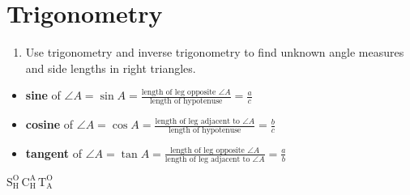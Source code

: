 \documentclass{article}
\begin{document}
\section*{Trigonometry}

\begin{tcolorbox}[colframe=orange!70!white, coltitle=black, title=\textbf{Today I Can}]
\begin{enumerate}
    \item Use trigonometry and inverse trigonometry to find unknown angle measures and side lengths in right triangles.
\end{enumerate}
\end{tcolorbox}
\bigskip 

\begin{minipage}{0.3\textwidth}
\end{minipage}
\begin{minipage}{0.6\textwidth}
\begin{itemize} \setlength{\itemsep}{15pt}
    \item \textbf{sine} of $\angle A = \sin A = \frac{\text{length of leg opposite }\angle A}{\text{length of hypotenuse}} = \frac{a}{c}$
    
    \item \textbf{cosine} of $\angle A = \cos A = \frac{\text{length of leg adjacent to }\angle A}{\text{length of hypotenuse}} = \frac{b}{c}$

    \item \textbf{tangent} of $\angle A = \tan A = \frac{\text{length of leg opposite }\angle A}{\text{length of leg adjacent to }\angle A} = \frac{a}{b}$
\end{itemize}
\end{minipage}
\smallskip 

\begin{center}
\begin{Large}
$\boxed{\text{S}_{\text{H}}^{\text{O}}  \, \text{C}_{\text{H}}^{\text{A}} \,
\text{T}_{\text{A}}^{\text{O}}}$
\end{Large}
\end{center}
\end{document}
